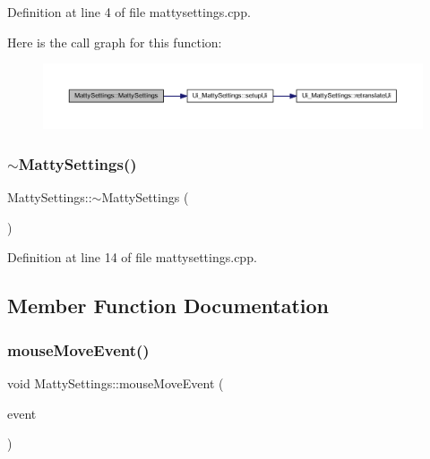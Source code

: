 Definition at line 4 of file mattysettings.\+cpp.

Here is the call graph for this function\+:
\nopagebreak
\begin{figure}[H]
\begin{center}
\leavevmode
\includegraphics[width=350pt]{classMattySettings_a0d5b0f74bacfcad4f084772a081294a9_cgraph}
\end{center}
\end{figure}
\hypertarget{classMattySettings_a361e58579542394627a34f07f408aa3a}{}\label{classMattySettings_a361e58579542394627a34f07f408aa3a} 
\subsubsection{\texorpdfstring{$\sim$\+Matty\+Settings()}{~MattySettings()}}
{\footnotesize\ttfamily Matty\+Settings\+::$\sim$\+Matty\+Settings (\begin{DoxyParamCaption}{ }\end{DoxyParamCaption})}



Definition at line 14 of file mattysettings.\+cpp.



\subsection{Member Function Documentation}
\hypertarget{classMattySettings_a0d151b91e1d79229d6ae0addf858c0d8}{}\label{classMattySettings_a0d151b91e1d79229d6ae0addf858c0d8} 
\subsubsection{\texorpdfstring{mouse\+Move\+Event()}{mouseMoveEvent()}}
{\footnotesize\ttfamily void Matty\+Settings\+::mouse\+Move\+Event (\begin{DoxyParamCaption}\item[{Q\+Mouse\+Event $\ast$}]{event }\end{DoxyParamCaption})\hspace{0.3cm}{\ttfamily [private]}}



